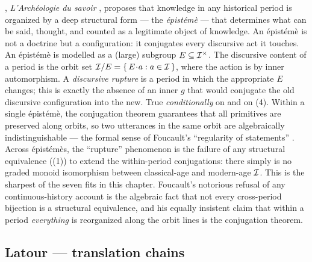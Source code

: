 \begin{zooentry*}
, \emph{L'Arch\'eologie du savoir}
\cite{Foucault1969}, proposes that knowledge in any historical period
is organized by a deep structural form --- the \emph{épistémè} ---
that determines what can be said, thought, and counted as a
legitimate object of knowledge. An épistémè is not a doctrine but a
configuration: it conjugates every discursive act it touches.
\formalclaim An épistémè is modelled as a (large) subgroup
$E\subseteq\mathcal{I}^{\times}$. The discursive content of a period is
the orbit set $\mathcal{I}/E = \{\,E\!\cdot\! a : a\in\mathcal{I}\,\}$, where
the action is by inner automorphism. A \emph{discursive rupture} is a
period in which the appropriate $E$ changes; this is exactly the
absence of an inner $g$ that would conjugate the old discursive
configuration into the new.
\formalstatus
True \emph{conditionally} on  and on
(4). Within a single épistémè, the conjugation
theorem guarantees that all primitives are preserved along orbits, so
two utterances in the same orbit are algebraically indistinguishable
--- the formal sense of Foucault's ``regularity of statements''
\cite{Foucault1969}. Across épistémès, the ``rupture'' phenomenon is
the failure of any structural equivalence
((1)) to extend the within-period
conjugations: there simply is no graded monoid isomorphism between
classical-age and modern-age $\mathcal{I}$.
\litcomment
This is the sharpest of the seven fits in this chapter. Foucault's
notorious refusal of any continuous-history account is the algebraic
fact that not every cross-period bijection is a structural
equivalence, and his equally insistent claim that within a period
\emph{everything} is reorganized along the orbit lines is the
conjugation theorem.
\end{zooentry*}

\subsection{Latour --- translation chains}\label{zoo:latour}

